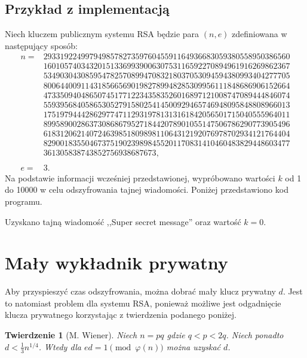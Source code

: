 \documentclass[12pt,twoside,a4]{mwbk}
\newtheorem{twierdzenie}{Twierdzenie}[chapter]
\theoremstyle{definition}
\begin{document}
\subsection{Przykład z implementacją}
Niech kluczem publicznym systemu RSA będzie para $(n,e)$ zdefiniowana w następujący sposób:
\begin{align*}
n = 
&29331922499794985782735976045591164936683059380558950386560 \\
&16010574034320151336993900630753116592270894961916269862367 \\
&53490304308595478257089947083218037053094594380993404277705 \\
&80064400911431856656901982789948285309956111848686906152664 \\
&47335094048650745177122343583526016897121008747089444846074 \\
&55939568405865305279158025414500929465746948095848808966013 \\
&17519794442862977471129319781313161842056501715040555964011 \\
&89958900286373086867952718442078901055147506786290773905496 \\
&61831206214072463985180989811064312192076978702934121764404 \\
&82900183550467375190239898455201170831410460483829448603477 \\
&361305838743852756938687673, \\ \\
e = &3.
\end{align*}
Na podstawie informacji wcześniej przedstawionej, wypróbowano wartości $k$ od 1 do 10000 w celu odszyfrowania tajnej wiadomości. Poniżej przedstawiono kod programu.


Uzyskano tajną wiadomość ,,Super secret message'' oraz wartość $k = 0$.

\section{Mały wykładnik prywatny}
Aby przyspieszyć czas odszyfrowania, można dobrać mały klucz prywatny $d$. Jest to natomiast problem dla systemu RSA, ponieważ możliwe jest odgadnięcie klucza prywatnego korzystając z twierdzenia podanego poniżej.

\begin{twierdzenie}[M. Wiener]{\cite{survey}}
Niech $n = pq$ gdzie $q < p < 2q$. Niech ponadto $d < \frac{1}{3}n^{1/4}$. Wtedy dla $ed = 1 \pmod{\varphi(n)}$ można uzyskać $d$.
\end{twierdzenie}
\end{document}
